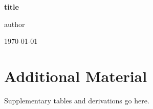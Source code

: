 \documentclass[12pt,a4paper,oneside,parskip=half,bibliography=totoc]{scrbook}
\begin{document}
\frontmatter
\begin{titlepage}
  \centering
  \vspace*{3cm}
  {\Huge\bfseries {{title}}\par}
  \vspace{2cm}
  {\Large {{author}}\par}
  \vfill
  {\large \today\par}
\end{titlepage}

\tableofcontents

\mainmatter




\appendix
\chapter{Additional Material}
Supplementary tables and derivations go here.

\backmatter


\end{document}
